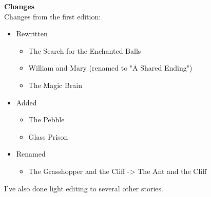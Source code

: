 \huge \textbf{Changes}\\

\large
Changes from the first edition:\\
\begin{itemize}
	\item Rewritten
	\begin{itemize}
		\item The Search for the Enchanted Balls
		\item William and Mary (renamed to "A Shared Ending")
		\item The Magic Brain
	\end{itemize}
	\item Added
	\begin{itemize}
		\item The Pebble
		\item Glass Prison
	\end{itemize}
	\item Renamed
	\begin{itemize}
		\item The Grasshopper and the Cliff -> The Ant and the Cliff
	\end{itemize}
\end{itemize}

I've also done light editing to several other stories.